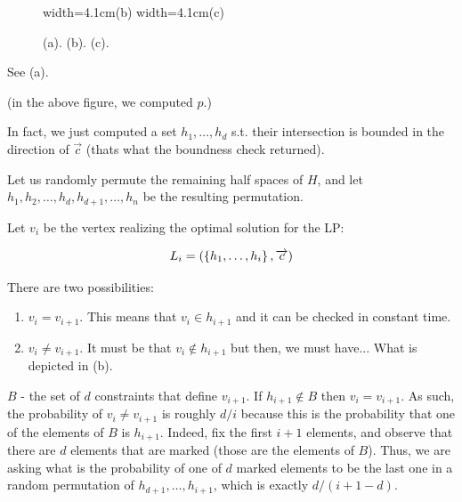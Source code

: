 \begin{figure}[t]
    {width=4.1cm}{}{(b)}
    {width=4.1cm}{}{(c)}

    \caption{(a). (b). (c).}
\end{figure}


See  (a).

(in the above figure, we computed $p$.)



In fact, we just computed a set $h_{1},\ldots,h_{d}$ s.t. their intersection
is bounded in the direction of $\overrightarrow{c}$ (thats what the
boundness check returned). 

Let us randomly permute the remaining half spaces of $H$, and let
$h_{1},h_{2},\ldots,h_{d},h_{d+1},\ldots,h_{n}$ be the resulting
permutation.


Let $v_{i}$ be the vertex realizing the optimal solution for the
LP:

\[
L_{i}=\pth{\brc{h_{1},\ldots,h_{i}},\overrightarrow{c}}\]


There are two possibilities:

\begin{enumerate}
    \item $v_{i}=v_{i+1}$. This means that $v_{i}\in h_{i+1}$ and it
    can be checked in constant time.

    \item $v_{i}\ne v_{i+1}.$ It must be that $v_{i}\notin h_{i+1}$
    but then,
    we must have... What is depicted in  (b).
\end{enumerate}
$B$ - the set of $d$ constraints that define $v_{i+1}$. If $h_{i+1}\notin B$
then $v_{i}=v_{i+1}.$ As such, the probability of $v_{i}\ne v_{i+1}$
is roughly $d/i$ because this is the probability that one of the elements
of $B$ is $h_{i+1}$. Indeed, fix the first $i+1$ elements, and
observe that there are $d$ elements that are marked (those are the
elements of $B$). Thus, we are asking what is the probability of
one of $d$ marked elements to be the last one in a random permutation
of $h_{d+1},\ldots,h_{i+1}$, which is exactly $d/(i+1-d)$.


